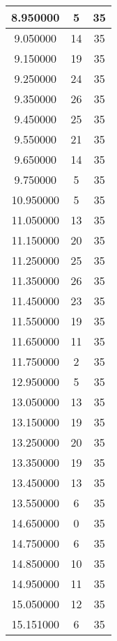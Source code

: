\begin{longtable}[htbp]{|c|c|c|}
8.950000 & 5 & 35 \\ \hline
9.050000 & 14 & 35 \\ \hline
9.150000 & 19 & 35 \\ \hline
9.250000 & 24 & 35 \\ \hline
9.350000 & 26 & 35 \\ \hline
9.450000 & 25 & 35 \\ \hline
9.550000 & 21 & 35 \\ \hline
9.650000 & 14 & 35 \\ \hline
9.750000 & 5 & 35 \\ \hline
10.950000 & 5 & 35 \\ \hline
11.050000 & 13 & 35 \\ \hline
11.150000 & 20 & 35 \\ \hline
11.250000 & 25 & 35 \\ \hline
11.350000 & 26 & 35 \\ \hline
11.450000 & 23 & 35 \\ \hline
11.550000 & 19 & 35 \\ \hline
11.650000 & 11 & 35 \\ \hline
11.750000 & 2 & 35 \\ \hline
12.950000 & 5 & 35 \\ \hline
13.050000 & 13 & 35 \\ \hline
13.150000 & 19 & 35 \\ \hline
13.250000 & 20 & 35 \\ \hline
13.350000 & 19 & 35 \\ \hline
13.450000 & 13 & 35 \\ \hline
13.550000 & 6 & 35 \\ \hline
14.650000 & 0 & 35 \\ \hline
14.750000 & 6 & 35 \\ \hline
14.850000 & 10 & 35 \\ \hline
14.950000 & 11 & 35 \\ \hline
15.050000 & 12 & 35 \\ \hline
15.151000 & 6 & 35 \\ \hline
\end{longtable}
